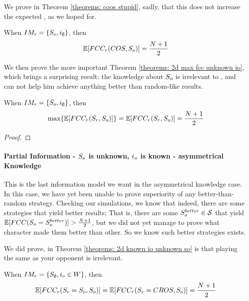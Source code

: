 \documentclass[a4paper,english,10pt]{article}
\begin{document}
We prove in Theorem \ref{theorems: coos stupid}, sadly, that this does not increase the expected \fcc, as we hoped for.
\begin{theorem} \label{theorems: coos stupid}
 When $IM_r=\lbrace S_o , i_\emptyset \rbrace$, then \[\mathbb{E}[FCC_r(COS, S_o)]=\frac{N+1}{2}\]
\end{theorem}

We then prove the more important Theorem \ref{theorems: 2d max fcc unknown io}, which brings a surprising result: the knowledge about $S_o$ is irrelevant to \opp, and can not help him achieve anything better than random-like results.

\begin{theorem}\label{theorems: 2d max fcc unknown io}
When $IM_r=\lbrace S_o , i_\emptyset \rbrace$, then \[\max \lbrace \mathbb{E}[FCC_r(S_r, S_o)]\rbrace=\mathbb{E}[FCC_r(S_r, S_o)]=\frac{N+1}{2}\]
\end{theorem}
\begin{proof}

\end{proof}


\paragraph{Partial Information - $S_o$ is unknown, $i_o$ is known - asymmetrical Knowledge} 
This is the last information model we want in the asymmetrical knowledge case. In this case, we have yet been unable to prove superiority of any better-than-random strategy.
Checking our simulations, we know that indeed, there are some strategies that yield better results; That is, there are some $S^{better}_{o}\in \mathcal{S}$ that yield $\mathbb{E}[FCC(S_o=S^{better}_{o})] > \frac{N+1}{2}$, but we did not yet manage to prove what character made them better than other. So we know such better strategies exists.

We did prove, in Theorem \ref{theorems: 2d known io unknown so} is that playing the same as your opponent is irrelevant.
\begin{theorem} \label{theorems: 2d known io unknown so}
When $IM_r = \lbrace S_\emptyset, i_o \in W \rbrace$, then \[\mathbb{E}[FCC_r(S_r=S_o, S_o)] = \mathbb{E}[FCC_r(S_r=CROS, S_o)] = \frac{N+1}{2}\]
\end{theorem}


\end{document}
